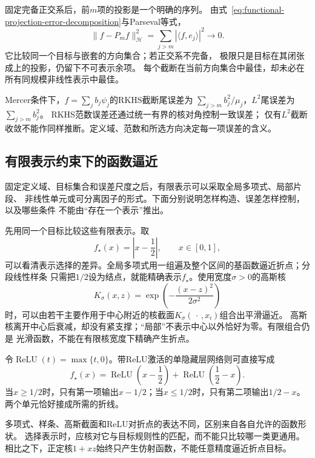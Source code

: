 固定完备正交系后，前$m$项的投影是一个明确的序列。
由式~\eqref{eq:functional-projection-error-decomposition}与Parseval等式，
\[
 \lVert f-P_mf\rVert_{\mathcal H}^2
 =\sum_{j>m}|\langle f,e_j\rangle|^2\to0.
\]
它比较同一个目标与嵌套的方向集合；若正交系不完备，
极限只是目标在其闭张成上的投影，仍留下不可表示余项。
每个截断在当前方向集合中最佳，却未必在所有同规模非线性表示中最佳。

Mercer条件下，$f=\sum_j b_j\psi_j$的RKHS截断尾误差为
$\sum_{j>m}b_j^2/\mu_j$，$L^2$尾误差为$\sum_{j>m}b_j^2$。
RKHS范数误差还通过统一有界的核对角控制一致误差；
仅有$L^2$截断收敛不能作同样推断。定义域、范数和所选方向决定每一项误差的含义。

\subsection{有限表示约束下的函数逼近}
\label{sec:functional-approximation-capacity-representation}

固定定义域、目标集合和误差尺度之后，有限表示可以采取全局多项式、局部片段、
非线性单元或可分离因子的形式。下面分别说明怎样构造、误差怎样控制，以及哪些条件
不能由“存在一个表示”推出。

先用同一个目标比较这些有限表示。取
\[
  f_\star(x)=\left|x-\frac12\right|,
  \qquad x\in[0,1],
\]
可以看清表示选择的差异。全局多项式用一组遍及整个区间的基函数逼近折点；分段线性样条
只需把$1/2$设为结点，就能精确表示$f_\star$。使用宽度$\sigma>0$的高斯核
\[
  K_\sigma(x,z)
  =
  \exp\left(-\frac{(x-z)^2}{2\sigma^2}\right)
\]
时，可以由若干主要作用于中心附近的核截面$K_\sigma(\,\cdot\,,x_i)$组合出平滑逼近。
高斯核离开中心后衰减，却没有紧支撑；“局部”不表示中心以外恰好为零。有限组合仍是
光滑函数，不能在有限核宽度下精确产生折点。

令$\operatorname{ReLU}(t)=\max\{t,0\}$。带ReLU激活的单隐藏层网络则可直接写成
\[
  f_\star(x)
  =
  \operatorname{ReLU}\left(x-\frac12\right)
  +
  \operatorname{ReLU}\left(\frac12-x\right).
\]
当$x\geq1/2$时，只有第一项输出$x-1/2$；当$x\leq1/2$时，只有第二项输出$1/2-x$。
两个单元恰好接成所需的折线。

多项式、样条、高斯截面和ReLU对折点的表达不同，区别来自各自允许的函数形状。
选择表示时，应核对它与目标规则性的匹配，而不能只比较哪一类更通用。
相比之下，正定核$1+xz$始终只产生仿射函数，不能任意精度逼近折点目标。

